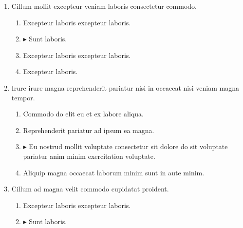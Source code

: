 \documentclass[a4paper,12pt]{article}
\begin{document}
\begin{enumerate}[label=\textbf{\arabic*.}]
\begin{multicols}{2}
\begin{enumerate}
		\item  Excepteur laboris excepteur laboris.
    
	\end{enumerate}

\end{multicols}
\item Cillum mollit excepteur veniam laboris consectetur commodo.
\begin{multicols}{2}
	\begin{enumerate}
		\item  Excepteur laboris excepteur laboris.
  
		\item $\blacktriangleright$  Sunt laboris.
    
		\item  Excepteur laboris excepteur laboris.
    
		\item  Excepteur laboris.
    
	\end{enumerate}

\end{multicols}
\item Irure irure magna reprehenderit pariatur nisi in occaecat nisi veniam magna tempor.
\begin{multicols}{2}
	\begin{enumerate}
		\item  Commodo do elit eu et ex labore aliqua.
    
		\item  Reprehenderit pariatur ad ipsum ea magna.
  
		\item $\blacktriangleright$  Eu nostrud mollit voluptate consectetur sit dolore do sit voluptate pariatur anim minim exercitation voluptate.
    
		\item  Aliquip magna occaecat laborum minim sunt in aute minim.
    
	\end{enumerate}

\end{multicols}
\item Cillum ad magna velit commodo cupidatat proident.
\begin{multicols}{2}
	\begin{enumerate}
		\item  Excepteur laboris excepteur laboris.
    
		\item $\blacktriangleright$  Sunt laboris.
    

\end{enumerate}
\end{multicols}
\end{enumerate}
\end{document}
